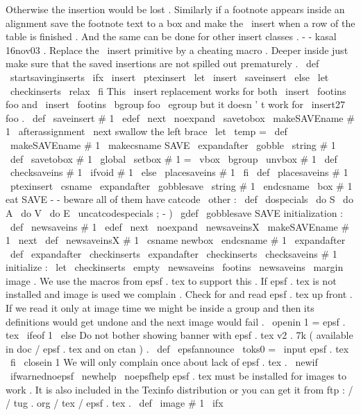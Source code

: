 {{{{Otherwise
the
insertion
%
would
be
lost
.
%
Similarly
if
a
footnote
appears
inside
an
alignment
save
the
footnote
%
text
to
a
box
and
make
the
\
insert
when
a
row
of
the
table
is
finished
.
%
And
the
same
can
be
done
for
other
insert
classes
.
-
-
kasal
16nov03
.
%
Replace
the
\
insert
primitive
by
a
cheating
macro
.
%
Deeper
inside
just
make
sure
that
the
saved
insertions
are
not
spilled
%
out
prematurely
.
%
\
def
\
startsavinginserts
{
%
\
ifx
\
insert
\
ptexinsert
\
let
\
insert
\
saveinsert
\
else
\
let
\
checkinserts
\
relax
\
fi
}
%
This
\
insert
replacement
works
for
both
\
insert
\
footins
{
foo
}
and
%
\
insert
\
footins
\
bgroup
foo
\
egroup
but
it
doesn
'
t
work
for
\
insert27
{
foo
}
.
%
\
def
\
saveinsert
#
1
{
%
\
edef
\
next
{
\
noexpand
\
savetobox
\
makeSAVEname
#
1
}
%
\
afterassignment
\
next
%
swallow
the
left
brace
\
let
\
temp
=
}
\
def
\
makeSAVEname
#
1
{
\
makecsname
{
SAVE
\
expandafter
\
gobble
\
string
#
1
}
}
\
def
\
savetobox
#
1
{
\
global
\
setbox
#
1
=
\
vbox
\
bgroup
\
unvbox
#
1
}
\
def
\
checksaveins
#
1
{
\
ifvoid
#
1
\
else
\
placesaveins
#
1
\
fi
}
\
def
\
placesaveins
#
1
{
%
\
ptexinsert
\
csname
\
expandafter
\
gobblesave
\
string
#
1
\
endcsname
{
\
box
#
1
}
%
}
%
eat
SAVE
-
-
beware
all
of
them
have
catcode
\
other
:
{
\
def
\
dospecials
{
\
do
S
\
do
A
\
do
V
\
do
E
}
\
uncatcodespecials
%
;
-
)
\
gdef
\
gobblesave
SAVE
{
}
}
%
initialization
:
\
def
\
newsaveins
#
1
{
%
\
edef
\
next
{
\
noexpand
\
newsaveinsX
\
makeSAVEname
#
1
}
%
\
next
}
\
def
\
newsaveinsX
#
1
{
%
\
csname
newbox
\
endcsname
#
1
%
\
expandafter
\
def
\
expandafter
\
checkinserts
\
expandafter
{
\
checkinserts
\
checksaveins
#
1
}
%
}
%
initialize
:
\
let
\
checkinserts
\
empty
\
newsaveins
\
footins
\
newsaveins
\
margin
%
image
.
We
use
the
macros
from
epsf
.
tex
to
support
this
.
%
If
epsf
.
tex
is
not
installed
and
image
is
used
we
complain
.
%
%
Check
for
and
read
epsf
.
tex
up
front
.
If
we
read
it
only
at
image
%
time
we
might
be
inside
a
group
and
then
its
definitions
would
get
%
undone
and
the
next
image
would
fail
.
\
openin
1
=
epsf
.
tex
\
ifeof
1
\
else
%
Do
not
bother
showing
banner
with
epsf
.
tex
v2
.
7k
(
available
in
%
doc
/
epsf
.
tex
and
on
ctan
)
.
\
def
\
epsfannounce
{
\
toks0
=
}
%
\
input
epsf
.
tex
\
fi
\
closein
1
%
%
We
will
only
complain
once
about
lack
of
epsf
.
tex
.
\
newif
\
ifwarnednoepsf
\
newhelp
\
noepsfhelp
{
epsf
.
tex
must
be
installed
for
images
to
work
.
It
is
also
included
in
the
Texinfo
distribution
or
you
can
get
it
from
ftp
:
/
/
tug
.
org
/
tex
/
epsf
.
tex
.
}
%
\
def
\
image
#
1
{
%
\
ifx
}}}}}
